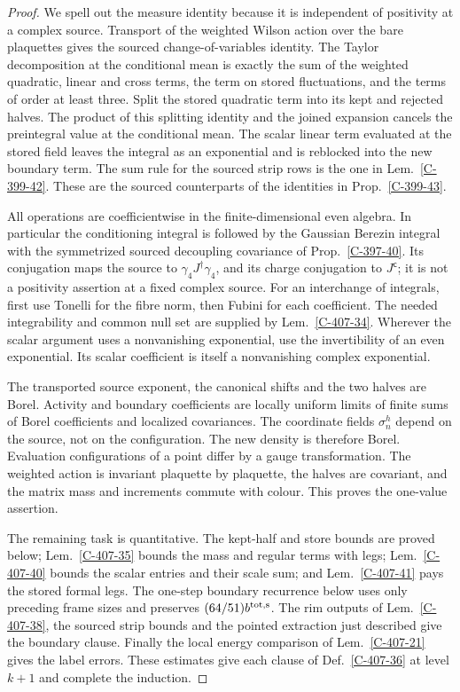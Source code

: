 \documentclass[11pt,letterpaper,reqno]{amsart}
\theoremstyle{definition}
\theoremstyle{remark}
\begin{document}
\begin{proof}
We spell out the measure identity because it is independent of
positivity at a complex source. Transport of the weighted
Wilson action over the bare plaquettes gives the sourced
change-of-variables identity. The Taylor decomposition at the
conditional mean is exactly the sum of the weighted quadratic,
linear and cross terms, the term on stored fluctuations, and
the terms of order at least three. Split the stored quadratic
term into its kept and rejected halves. The product of this
splitting identity and the joined expansion cancels the
preintegral value at the conditional mean. The scalar linear
term evaluated at the stored field leaves the integral as an
exponential and is reblocked into the new boundary term. The
sum rule for the sourced strip rows is the one in
Lem.~\ref{C-399-42}. These are the sourced counterparts of
the identities in Prop.~\ref{C-399-43}.

All operations are coefficientwise in the finite-dimensional
even algebra. In particular the conditioning integral is
followed by the Gaussian Berezin integral with the symmetrized
sourced decoupling covariance of Prop.~\ref{C-397-40}.
Its conjugation maps the source to $\gamma_4J^\dagger\gamma_4$,
and its charge conjugation to $J^{\mathsf c}$; it is not a
positivity assertion at a fixed complex source. For an
interchange of integrals, first use Tonelli for the fibre norm,
then Fubini for each coefficient. The needed integrability and
common null set are supplied by Lem.~\ref{C-407-34}. Wherever
the scalar argument uses a nonvanishing exponential, use the
invertibility of an even exponential. Its scalar coefficient
is itself a nonvanishing complex exponential.

The transported source exponent, the canonical shifts and the
two halves are Borel. Activity and boundary coefficients are
locally uniform limits of finite sums of Borel coefficients
and localized covariances. The coordinate fields $\sigma_n^h$
depend on the source, not on the configuration. The new density
is therefore Borel. Evaluation configurations of a point
differ by a gauge transformation. The weighted action is
invariant plaquette by plaquette, the halves are covariant,
and the matrix mass and increments commute with colour. This
proves the one-value assertion.

The remaining task is quantitative. The kept-half and store
bounds are proved below; Lem.~\ref{C-407-35} bounds the mass
and regular terms with legs; Lem.~\ref{C-407-40} bounds the
scalar entries and their scale sum; and
Lem.~\ref{C-407-41} pays the stored formal legs. The one-step
boundary recurrence below uses only preceding frame sizes and
preserves $(64/51)b^{\rm tot,s}$. The rim outputs of
Lem.~\ref{C-407-38}, the sourced strip bounds and the pointed
extraction just described give the boundary clause. Finally
the local energy comparison of Lem.~\ref{C-407-21} gives the
label errors. These estimates give each clause of
Def.~\ref{C-407-36} at level $k+1$ and complete the
induction.
\end{proof}
\end{document}
